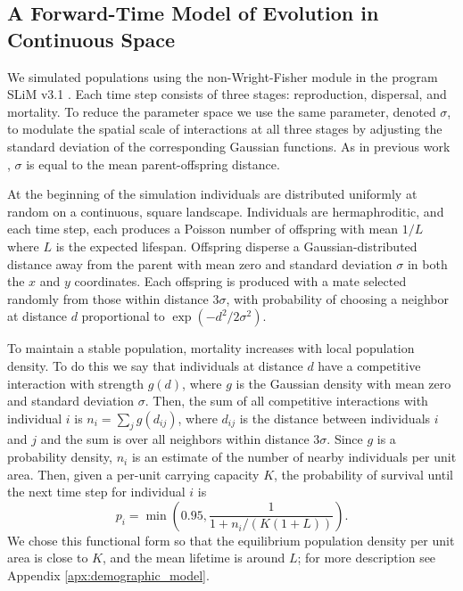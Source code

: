 \documentclass[10pt,twoside,lineno,hidelinks]{preprint}
\begin{document}
\subsection{A Forward-Time Model of Evolution in Continuous Space}

We simulated populations using the non-Wright-Fisher module in the program SLiM v3.1 \citep{Haller2019}. 
Each time step consists of three stages: reproduction, dispersal, and mortality. 
To reduce the parameter space we use the same parameter, denoted $\sigma$, 
to modulate the spatial scale of interactions at all three stages by adjusting the standard deviation of the corresponding Gaussian functions. 
As in previous work \citep{Wright1943,Ringbauer2017}, $\sigma$ is equal to the mean parent-offspring distance.  

At the beginning of the simulation individuals are distributed uniformly at random on a continuous, square landscape. 
Individuals are hermaphroditic, and each time step, each produces a Poisson number of offspring with mean $1/L$ where $L$ is the expected lifespan.
Offspring disperse a Gaussian-distributed distance away from the parent with mean zero and standard deviation $\sigma$
in both the $x$ and $y$ coordinates.
Each offspring is produced with a mate selected randomly from those within distance $3 \sigma$,
with probability of choosing a neighbor at distance $d$ proportional to $\exp(-d^2 / 2 \sigma^2)$.

To maintain a stable population, mortality increases with local population density.
To do this we say that individuals at distance $d$ have a competitive interaction with strength $g(d)$,
where $g$ is the Gaussian density with mean zero and standard deviation $\sigma$.
Then, the sum of all competitive interactions with individual $i$ is $n_i = \sum_j g(d_{ij})$,
where $d_{ij}$ is the distance between individuals $i$ and $j$ and the sum is over all neighbors within distance $3 \sigma$.
Since $g$ is a probability density, $n_i$ is an estimate of the number of nearby individuals per unit area.
Then, given a per-unit carrying capacity $K$, 
the probability of survival until the next time step for individual $i$ is
\begin{equation} \label{eqn:p_survival}
    p_i 
    =
    \min\left( 0.95, \frac{1}{1 + n_i / (K (1+L))} \right) .
\end{equation}
We chose this functional form so that the equilibrium population density per unit area is close to $K$, 
and the mean lifetime is around $L$;
for more description see Appendix \ref{apx:demographic_model}.
\end{document}
